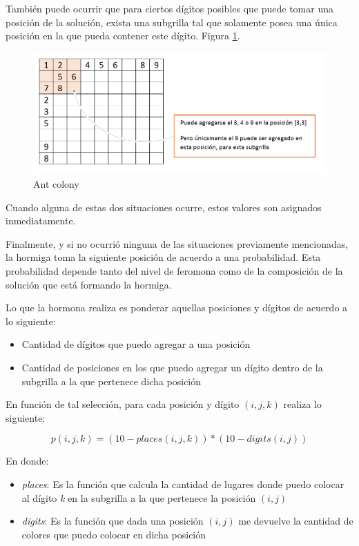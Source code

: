 \documentclass[a4paper,spanish]{article}
\begin{document}
También puede ocurrir que para ciertos dígitos posibles que puede tomar una posición de la solución,
exista una subgrilla tal que solamente posea una única posición en la que pueda contener este dígito.
Figura \ref{img:undigitosolo}.

\begin{figure}[h]
	\centering
	\includegraphics[scale=0.4]{./img/undigitosolo.png}
	\caption{Ant colony}
	\label{img:undigitosolo}
\end{figure}

Cuando alguna de estas dos situaciones ocurre, estos valores son asignados inmediatamente.

Finalmente, y si no ocurrió ninguna de las situaciones previamente mencionadas, la hormiga toma la
siguiente posición de acuerdo a una probabilidad. Esta probabilidad depende tanto del nivel de
feromona como de la composición de la solución que está formando la hormiga.

Lo que la hormona realiza es ponderar aquellas posiciones y dígitos de acuerdo a lo siguiente:

\begin{itemize}
	\item Cantidad de dígitos que puedo agregar a una posición
	\item Cantidad de posiciones en los que puedo agregar un dígito dentro de la subgrilla a la que
		  pertenece dicha posición
\end{itemize}

En función de tal selección, para cada posición y dígito $(i,j,k)$ realiza lo siguiente:

\begin{equation}
	p(i,j,k)=(10-places(i,j,k))*(10-digits(i,j))
\end{equation}

\pagebreak

En donde:

\begin{itemize}
	\item \emph{places}: Es la función que calcula la cantidad de lugares donde puedo colocar al
		  dígito \emph{k} en la subgrilla a la que pertenece la posición $(i,j)$
	\item \emph{digits}: Es la función que dada una posición $(i,j)$ me devuelve la cantidad de
	      colores que puedo colocar en dicha posición
\end{itemize}
\end{document}
